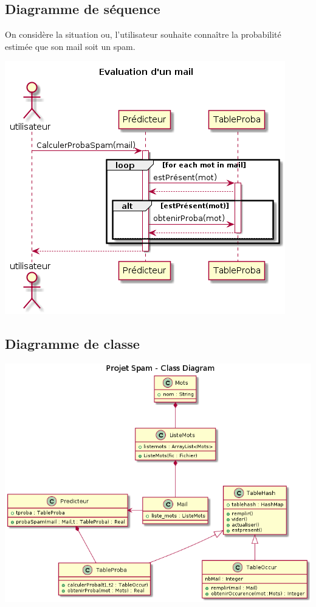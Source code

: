 \documentclass{article}
\begin{document}
\subsection{Diagramme de séquence}
On considère la situation ou, l'utilisateur souhaite connaître la probabilité estimée que son mail soit un spam.

\includegraphics[scale=0.7]{diag_sequence.png}

\subsection{Diagramme de classe}

\includegraphics[scale=0.5]{diag_classe.png}





 
\end{document}
